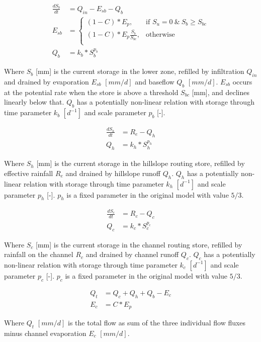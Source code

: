 \begin{align}
	\frac{dS_b}{dt} &= Q_{in} - E_{sb} - Q_b \\
	E_{sb} &= \begin{cases}
		(1-C)*E_p, &\text{if } S_u = 0  ~\&~ S_b \geq S_{bc} \\
		(1-C)*E_p\frac{S_b}{S_{bc}}, &\text{otherwise} \\
	\end{cases} \\
	Q_b &= k_b*S_b^{p_b}
\end{align}

Where $S_b$ [mm] is the current storage in the lower zone, refilled by infiltration $Q_{in}$ and drained by evaporation $E_{sb}$ $[mm/d]$ and baseflow $Q_b$ $[mm/d]$.
$E_{sb}$ occurs at the potential rate when the store is above a threshold $S_{bc}$ [mm], and declines linearly below that.
$Q_b$ has a potentially non-linear relation with storage through time parameter $k_b$ $[d^{-1}]$ and scale parameter $p_b$ [-].

\begin{align}
	\frac{dS_h}{dt} &= R_e - Q_h \\
	Q_h &=  k_h*S_h^{p_h}
\end{align}

Where $S_h$ [mm] is the current storage in the hillslope routing store, refilled by effective rainfall $R_e$ and drained by hillslope runoff $Q_h$.
$Q_h$ has a potentially non-linear relation with storage through time parameter $k_h$ $[d^{-1}]$ and scale parameter $p_h$ [-].
$p_h$ is a fixed parameter in the original model with value $5/3$.

\begin{align}
	\frac{dS_c}{dt} &= R_c - Q_c \\
	Q_c &=  k_c*S_c^{p_c}
\end{align}

Where $S_c$ [mm] is the current storage in the channel routing store, refilled by rainfall on the channel $R_c$ and drained by channel runoff $Q_c$.
$Q_c$ has a potentially non-linear relation with storage through time parameter $k_c$ $[d^{-1}]$ and scale parameter $p_c$ [-].
$p_c$ is a fixed parameter in the original model with value $5/3$.

\begin{align}
	Q_t &= Q_c+Q_h+Q_b-E_c \\
	E_c &= C*E_p
\end{align}

Where $Q_t$ $[mm/d]$ is the total flow as sum of the three individual flow fluxes minus channel evaporation $E_c$ $[mm/d]$. 

